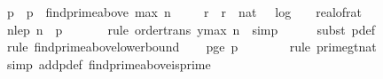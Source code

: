 \begin{isabellebody}
\ p\ \ {\isachardoublequoteopen}p\ {\isacharequal}{\kern0pt}\ find{\isacharunderscore}{\kern0pt}prime{\isacharunderscore}{\kern0pt}above\ {\isacharparenleft}{\kern0pt}max\ n\ {}{}{\isacharparenright}{\kern0pt}{\isachardoublequoteclose}\isanewline
\ \ \isamarkupfalse%
\ r\ \ {\isachardoublequoteopen}r\ {\isacharequal}{\kern0pt}\ nat\ {\isacharparenleft}{\kern0pt}{}\ {\isacharasterisk}{\kern0pt}\ {\isasymlceil}log\ {}\ {\isacharparenleft}{\kern0pt}{}\ {\isacharslash}{\kern0pt}\ real{\isacharunderscore}{\kern0pt}of{\isacharunderscore}{\kern0pt}rat\ {\isasymdelta}{\isacharparenright}{\kern0pt}{\isasymrceil}\ {\isacharplus}{\kern0pt}\ {}{}{\isacharparenright}{\kern0pt}{\isachardoublequoteclose}\isanewline
\isanewline
\ \ \isamarkupfalse%
\ n{\isacharunderscore}{\kern0pt}le{\isacharunderscore}{\kern0pt}p{\isacharcolon}{\kern0pt}\ {\isachardoublequoteopen}n\ {\isasymle}\ p{\isachardoublequoteclose}\ \isanewline
\ \ \ \ \isamarkupfalse%
\ {\isacharparenleft}{\kern0pt}rule\ order{\isacharunderscore}{\kern0pt}trans{\isacharbrackleft}{\kern0pt}\ y{\isacharequal}{\kern0pt}{\isachardoublequoteopen}max\ n\ {}{}{\isachardoublequoteclose}{\isacharbrackright}{\kern0pt}{\isacharcomma}{\kern0pt}\ simp{\isacharparenright}{\kern0pt}\isanewline
\ \ \ \ \isamarkupfalse%
\ {\isacharparenleft}{\kern0pt}subst\ p{\isacharunderscore}{\kern0pt}def{\isacharparenright}{\kern0pt}\isanewline
\ \ \ \ \isamarkupfalse%
\ {\isacharparenleft}{\kern0pt}rule\ find{\isacharunderscore}{\kern0pt}prime{\isacharunderscore}{\kern0pt}above{\isacharunderscore}{\kern0pt}lower{\isacharunderscore}{\kern0pt}bound{\isacharparenright}{\kern0pt}\isanewline
\isanewline
\ \ \isamarkupfalse%
\ p{\isacharunderscore}{\kern0pt}ge{\isacharunderscore}{\kern0pt}{}{\isacharcolon}{\kern0pt}\ {\isachardoublequoteopen}p\ {\isachargreater}{\kern0pt}\ {}{\isachardoublequoteclose}\isanewline
\ \ \ \ \isamarkupfalse%
\ {\isacharparenleft}{\kern0pt}rule\ prime{\isacharunderscore}{\kern0pt}gt{\isacharunderscore}{\kern0pt}{}{\isacharunderscore}{\kern0pt}nat{\isacharparenright}{\kern0pt}\isanewline
\ \ \ \ \isamarkupfalse%
\ {\isacharparenleft}{\kern0pt}simp\ add{\isacharcolon}{\kern0pt}p{\isacharunderscore}{\kern0pt}def\ find{\isacharunderscore}{\kern0pt}prime{\isacharunderscore}{\kern0pt}above{\isacharunderscore}{\kern0pt}is{\isacharunderscore}{\kern0pt}prime{\isacharparenright}{\kern0pt}\isanewline

\end{isabellebody}
